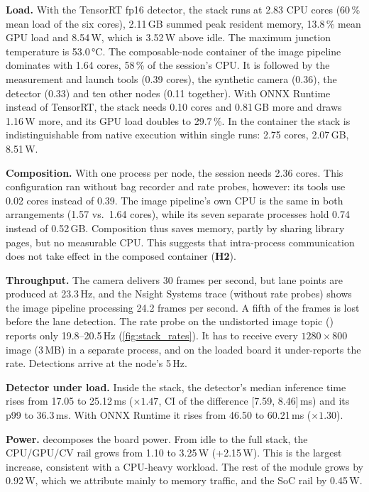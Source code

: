 \documentclass[11pt,a4paper]{article}
\newcommand{\hyp}[1]{\textbf{H#1}}
\begin{document}
\textbf{Load.} With the TensorRT fp16 detector, the stack runs at 2.83 CPU cores (60\,\% mean load of the six cores),
2.11\,GB summed peak resident memory, 13.8\,\% mean GPU load and 8.54\,W, which is 3.52\,W above idle. The maximum
junction temperature is 53.0\,\si{\celsius}. The composable-node container of the image pipeline dominates with 1.64
cores, 58\,\% of the session's CPU. It is followed by the measurement and launch tools (0.39 cores), the synthetic
camera (0.36), the detector (0.33) and ten other nodes (0.11 together). With ONNX Runtime instead of TensorRT, the
stack needs 0.10 cores and 0.81\,GB more and draws 1.16\,W more, and its GPU load doubles to 29.7\,\%. In the
container the stack is indistinguishable from native execution within single runs: 2.75 cores, 2.07\,GB, 8.51\,W.

\textbf{Composition.} With one process per node, the session needs 2.36 cores. This configuration ran without bag
recorder and rate probes, however: its tools use 0.02 cores instead of 0.39. The image pipeline's own CPU is the
same in both arrangements (1.57 vs.\ 1.64 cores), while its seven separate processes hold 0.74 instead of 0.52\,GB.
Composition thus saves memory, partly by sharing library pages, but no measurable CPU. This suggests that
intra-process communication does not take effect in the composed container (\hyp{2}).

\textbf{Throughput.} The camera delivers 30 frames per second, but lane points are produced at 23.3\,Hz, and the
Nsight Systems trace (without rate probes) shows the image pipeline processing 24.2 frames per second. A fifth of the
frames is lost before the lane detection. The rate probe on the undistorted image topic () reports
only 19.8--20.5\,Hz (\cref{fig:stack_rates}). It has to receive every $1280\times800$ image (3\,MB) in a separate
process, and on the loaded board it under-reports the rate. Detections arrive at the node's 5\,Hz.

\textbf{Detector under load.} Inside the stack, the detector's median inference time rises from 17.05 to 25.12\,ms
($\times 1.47$, CI of the difference [7.59, 8.46]\,ms) and its p99 to 36.3\,ms. With ONNX Runtime it rises from 46.50 to
60.21\,ms ($\times 1.30$).

\textbf{Power.}  decomposes the board power. From idle to the full stack, the CPU/GPU/CV rail
grows from 1.10 to 3.25\,W (+2.15\,W). This is the largest increase, consistent with a CPU-heavy workload. The rest of
the module grows by 0.92\,W, which we attribute mainly to memory traffic, and the SoC rail by 0.45\,W.
\end{document}
